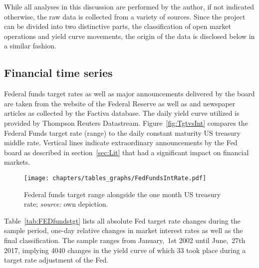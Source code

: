 
While all analyses in this discussion are performed by the author, if not indicated otherwise, the raw data is collected from a variety of sources. Since the project can be divided into two distinctive parts, the classification of open market operations and yield curve movements, the origin of the data is disclosed below in a similar fashion.

\subsection{Financial time series}
Federal funds target rates as well as major announcements delivered by the board are taken from the website of the Federal Reserve \cite{Fed.OMOs} as well as \textcite{Fawley.2013} and newspaper articles as collected by the Factiva database. The daily yield curve utilized is provided by Thompson Reuters Datastream. Figure~\vref{fig:TgtvsInt} compares the Federal Funds target rate (range) to the daily constant maturity US treasury middle rate. Vertical lines indicate extraordinary announcements by the Fed board as described in section~\ref{sec:Lit} that had a significant impact on financial markets.
\begin{figure}[htbp]
	\centering
		\texttt{[image: chapters/tables\_graphs/FedFundsIntRate.pdf]} 
	\caption[Federal funds target range alongside the one month US treasury rate.]{Federal funds target range alongside the one month US treasury rate; \textit{source:} own depiction.}
\label{fig:TgtvsInt}
\end{figure}
%

Table~\vref{tab:FEDfundstgt} lists all absolute Fed target rate changes during the sample period, one-day relative changes in market interest rates as well as the final classification. The sample ranges from January,~1st 2002 until June,~27th 2017, implying 4040 changes in the yield curve of which 33 took place during a target rate adjustment of the Fed. 
%

%

